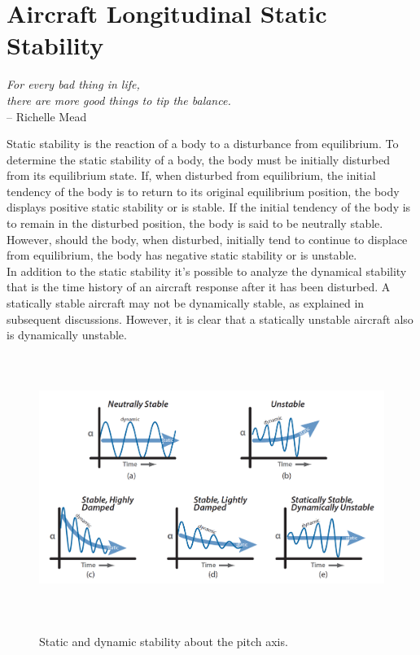 \chapter{Aircraft Longitudinal Static Stability}
\label{ch:workobject}
\begin{flushright}
	{\smaller
		\textit{For every bad thing in life, \\ there are more good things to tip the balance.}\\
		--  Richelle Mead}
\end{flushright}


Static stability is the reaction of a body to a disturbance from equilibrium. To determine the static stability of a body, the body must be initially disturbed from its equilibrium state. If, when disturbed from equilibrium, the initial tendency of the body is to return to its original equilibrium position, the body displays positive static stability or is stable. If the initial tendency of the body is to remain in the disturbed position, the body is said to be neutrally stable. However, should the body, when disturbed, initially tend to continue to displace from equilibrium, the body has negative static stability or is unstable. \cite{airf}\\
In addition to the static stability it's possible to analyze the dynamical stability that is the time history of an aircraft response after it has been disturbed. A statically stable aircraft may not be dynamically stable, as explained in subsequent discussions. However, it is clear that a statically unstable aircraft also is dynamically unstable.

\begin{figure}[H]
\centering
{\includegraphics[height=8.6cm]{Immagini/stability}} 
\label{wblc}
\caption{Static and dynamic stability about the pitch axis.}
\end{figure} 		

